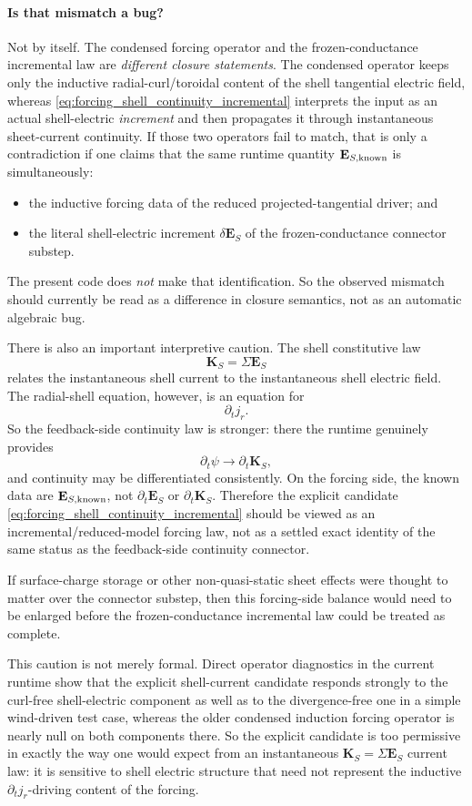 \documentclass[11pt,a4paper]{article}
\begin{document}
\paragraph{Is that mismatch a bug?}
Not by itself. The condensed forcing operator and the frozen-conductance
incremental law are \emph{different closure statements}. The condensed operator
keeps only the inductive radial-curl/toroidal content of the shell tangential
electric field, whereas \eqref{eq:forcing_shell_continuity_incremental}
interprets the input as an actual shell-electric \emph{increment} and then
propagates it through instantaneous sheet-current continuity. If those two
operators fail to match, that is only a contradiction if one claims that the
same runtime quantity \(\mathbf E_{S,\rm known}\) is simultaneously:
\begin{itemize}
\item the inductive forcing data of the reduced projected-tangential driver; and
\item the literal shell-electric increment \(\delta \mathbf E_S\) of the
frozen-conductance connector substep.
\end{itemize}
The present code does \emph{not} make that identification. So the observed
mismatch should currently be read as a difference in closure semantics, not as
an automatic algebraic bug.

There is also an important interpretive caution. The shell constitutive law
\[
\mathbf K_S = \Sigma \mathbf E_S
\]
relates the instantaneous shell current to the instantaneous shell electric
field. The radial-shell equation, however, is an equation for
\[
\partial_t j_r.
\]
So the feedback-side continuity law is stronger: there the runtime genuinely
provides
\[
\partial_t\psi \to \partial_t\mathbf K_S,
\]
and continuity may be differentiated consistently. On the forcing side, the
known data are \(\mathbf E_{S,\rm known}\), not \(\partial_t\mathbf E_S\) or
\(\partial_t\mathbf K_S\). Therefore the explicit candidate
\eqref{eq:forcing_shell_continuity_incremental} should be viewed as an
incremental/reduced-model forcing law, not as a settled exact identity of the
same status as the feedback-side continuity connector.

If surface-charge storage or other non-quasi-static sheet effects were thought
to matter over the connector substep, then this forcing-side balance would need
to be enlarged before the frozen-conductance incremental law could be treated
as complete.

This caution is not merely formal. Direct operator diagnostics in the current
runtime show that the explicit shell-current candidate responds strongly to the
curl-free shell-electric component as well as to the divergence-free one in a
simple wind-driven test case, whereas the older condensed induction forcing
operator is nearly null on both components there. So the explicit candidate is
too permissive in exactly the way one would expect from an instantaneous
\(\mathbf K_S=\Sigma\mathbf E_S\) current law: it is sensitive to shell
electric structure that need not represent the inductive
\(\partial_t j_r\)-driving content of the forcing.
\end{document}
